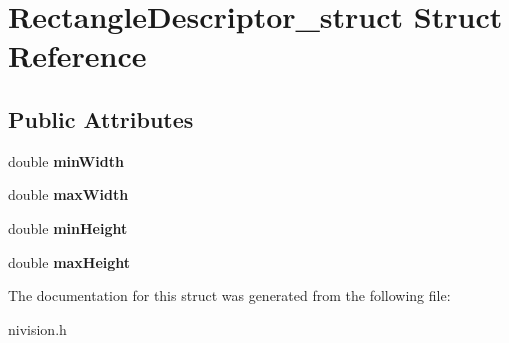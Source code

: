 \hypertarget{structRectangleDescriptor__struct}{\section{\-Rectangle\-Descriptor\-\_\-struct \-Struct \-Reference}
\label{structRectangleDescriptor__struct}
}
\subsection*{\-Public \-Attributes}
\begin{DoxyCompactItemize}
\item 
\hypertarget{structRectangleDescriptor__struct_af4e1ed6e3a5b57fbb7bd56dca6f3c051}{double {\bfseries min\-Width}}\label{structRectangleDescriptor__struct_af4e1ed6e3a5b57fbb7bd56dca6f3c051}

\item 
\hypertarget{structRectangleDescriptor__struct_a1a7bad876dd5731233ccef86f479f625}{double {\bfseries max\-Width}}\label{structRectangleDescriptor__struct_a1a7bad876dd5731233ccef86f479f625}

\item 
\hypertarget{structRectangleDescriptor__struct_a9c174b782c3fc8020f2576f2f14be18b}{double {\bfseries min\-Height}}\label{structRectangleDescriptor__struct_a9c174b782c3fc8020f2576f2f14be18b}

\item 
\hypertarget{structRectangleDescriptor__struct_abf7e93568b6c09d63c2271fd54b81322}{double {\bfseries max\-Height}}\label{structRectangleDescriptor__struct_abf7e93568b6c09d63c2271fd54b81322}

\end{DoxyCompactItemize}


\-The documentation for this struct was generated from the following file\-:\begin{DoxyCompactItemize}
\item 
nivision.\-h\end{DoxyCompactItemize}
